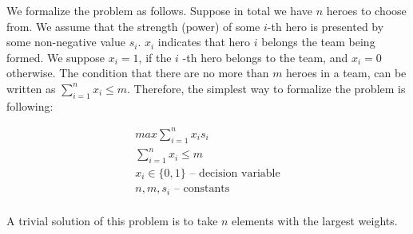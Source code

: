 \documentclass[smallextended]{svjour3}       %
\begin{document}
We formalize the problem as follows.
Suppose in total we have $n$ heroes to choose from.
We assume that the strength (power) of some $i$-th hero is presented by some non-negative value $s_i$.
$x_i$ indicates that hero $i$ belongs the team being formed.
We suppose $ x_i = 1 $, if the $ i $ -th hero belongs to the team, and $ x_i = 0 $ otherwise.
The condition that there are no more than $m$ heroes in a team, can be written as $ \sum_{i=1}^n x_i \leq m $.
Therefore, the simplest way to formalize the problem is following:

\begin{equation}
\begin{gathered}
    max \sum_{i=1}^n x_i s_i \\
    \sum_{i=1}^n x_i \leq m \\
    x_i \in \{0, 1\} \text{ – decision variable} \\
   n, m, s_i \text{ – constants}  \\
\end{gathered}
\end{equation}

A trivial solution of this problem is to take $ n $ elements with the largest weights.
\end{document}
